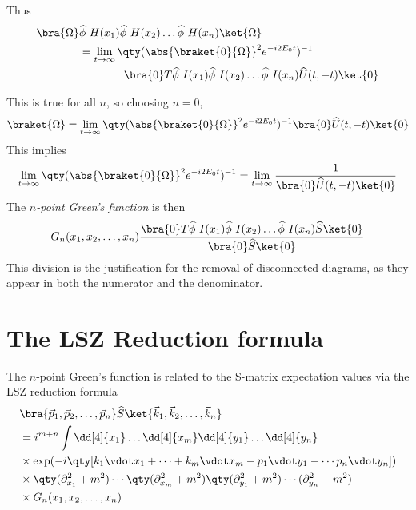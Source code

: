 Thus
\begin{align*}
  \bra{\Omega} & \Op{\phi}~H(x_1) \Op{\phi}~H(x_2) \dots \Op{\phi}~H(x_n)  \ket{\Omega} \\
&=  \lim_{t \to \infty} \qty(\abs{\braket{0}{\Omega}}^2 e^{-i 2E_0 t} )^{-1}
\\ & \qquad \qquad \bra{0}T \Op{\phi}~I(x_1) \Op{\phi}~I(x_2) \dots \Op{\phi}~I(x_n) \Op{U}(t,-t) \ket{0}
\end{align*}

This is true for all $n$, so choosing $n=0$,
\begin{align*}
  \braket{\Omega} = \lim_{t \to \infty} \qty( \abs{ \braket{0}{\Omega} }^2 e^{-i 2 E_0 t} )^{-1} \bra{0} \Op{U}(t,-t) \ket{0} 
\end{align*}
This implies
\begin{equation}
  \label{eq:77}
  \lim_{t \to \infty} \qty( \abs{ \braket{0}{\Omega} }^2 e^{-i 2 E_0 t} )^{-1} = \lim_{t \to \infty} \frac{1}{\bra{0} \Op{U}(t,-t) \ket{0}}
\end{equation}
The \emph{$n$-point Green's function} is then
\begin{equation}
  \label{eq:78}
  G_n (x_1, x_2, \dots, x_n) \frac{\bra{0} T \Op{\phi}~I(x_1) \Op{\phi}~I(x_2) \dots \Op{\phi}~I(x_n) \Op{S}\ket{0}}{\bra{0} \Op{S} \ket{0}}
\end{equation}
This division is the justification for the removal of disconnected
diagrams, as they appear in both the numerator and the denominator.

\section{The LSZ Reduction formula}
\label{sec:lsz-reduct-form}

The $n$-point Green's function is related to the S-matrix expectation
values via the LSZ reduction formula
\begin{align*}
&  \bra{\vec{p}_1, \vec{p}_2, \dots, \vec{p}_n} \Op{S} \ket{\vec{k}_1, \vec{k}_2, \dots, \vec{k}_n} \\
&= i^{m+n} \int \dd[4]{x_1} \dots \dd[4]{x_m} \dd[4]{y_1} \dots \dd[4]{y_n} \\
& \times \exp(-i \qty[ k_1 \vdot x_1 + \cdots + k_m \vdot x_m - p_1 \vdot y_1 - \cdots p_n \vdot y_n])\\
& \times \qty( \partial_{x_1}^2 + m^2) \cdots \qty(\partial_{x_m}^2 + m^2) \qty( \partial_{y_1}^2 + m^2) \cdots (\partial_{y_n}^2 + m^2) \\
& \times G_n(x_1, x_2, \dots, x_n)
\end{align*}

